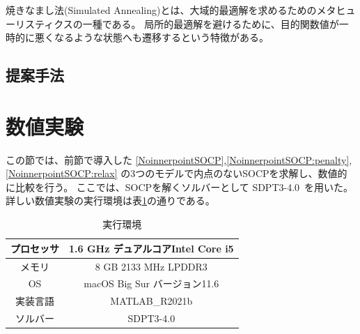 \documentclass[11pt,a4paper,dvipdfmx,titlepage,uplatex]{jsarticle}
\theoremstyle{mystyle}
\newcommand{\0}{\mathbf{0}}
\begin{document}
焼きなまし法(Simulated Annealing)とは、大域的最適解を求めるためのメタヒューリスティクスの一種である。 局所的最適解を避けるために、目的関数値が一時的に悪くなるような状態へも遷移するという特徴がある。
\subsection{提案手法}
%
\section{数値実験}\label{sec:Numerical_Experience}
この節では、前節で導入した
\eqref{NoinnerpointSOCP},\eqref{NoinnerpointSOCP:penalty},\eqref{NoinnerpointSOCP:relax}
の3つのモデルで内点のないSOCPを求解し、数値的に比較を行う。
ここでは、SOCPを解くソルバーとして
SDPT3-4.0~\cite{toh2012implementation}を用いた。
詳しい数値実験の実行環境は表\ref{table:Execution_environment}の通りである。
\begin{table}[hbtp]
  \caption{実行環境}
  \label{table:Execution_environment}
  \centering
  \begin{tabular}{|c|c|}
    \hline
    プロセッサ  & 1.6 GHz デュアルコアIntel Core i5 \\
    \hline
    メモリ  & 8 GB 2133 MHz LPDDR3 \\
    \hline
    OS  & macOS Big Sur バージョン11.6 \\
    \hline
    実装言語  &  MATLAB\_R2021b \\
    \hline
    ソルバー & SDPT3-4.0 \\
    \hline
  \end{tabular}
\end{table}
\end{document}
